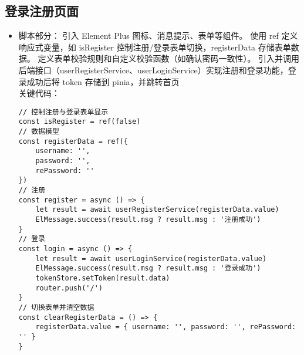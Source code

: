 \documentclass[bachelor]{thesis-uestc}
\begin{document}
\subsection{登录注册页面}
\begin{itemize}
\item 脚本部分：
引入 Element Plus 图标、消息提示、表单等组件。
使用 ref 定义响应式变量，如 isRegister 控制注册/登录表单切换，registerData 存储表单数据。
定义表单校验规则和自定义校验函数（如确认密码一致性）。
引入并调用后端接口（userRegisterService、userLoginService）实现注册和登录功能，登录成功后将 token 存储到 pinia，并跳转首页
\\关键代码：
\begin{lstlisting}
// 控制注册与登录表单显示
const isRegister = ref(false)
// 数据模型
const registerData = ref({
    username: '',
    password: '',
    rePassword: ''
})
// 注册
const register = async () => {
    let result = await userRegisterService(registerData.value)
    ElMessage.success(result.msg ? result.msg : '注册成功')
}
// 登录
const login = async () => {
    let result = await userLoginService(registerData.value)
    ElMessage.success(result.msg ? result.msg : '登录成功')
    tokenStore.setToken(result.data)
    router.push('/')
}
// 切换表单并清空数据
const clearRegisterData = () => {
    registerData.value = { username: '', password: '', rePassword: '' }
}
\end{lstlisting}


\end{itemize}
\end{document}
